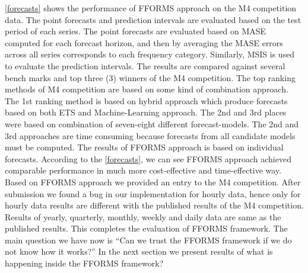 \documentclass[11pt,a4paper,]{article}
\begin{document}
\autoref{forecasts} shows the performance of FFORMS approach on the M4 competition data. The point forecasts and prediction intervals are evaluated based on the test period of each series. The point forecasts are evaluated based on MASE computed for each forecast horizon, and then by averaging the MASE errors across all series corresponds to each frequency category. Similarly, MSIS is used to evaluate the prediction intervals. The results are compared against several bench marks and top three (3) winners of the M4 competition. The top ranking methods of M4 competition are based on some kind of combination approach. The 1st ranking method is based on hybrid approach which produce forecasts based on both ETS and Machine-Learning approach. The 2nd and 3rd places were based on combination of seven-eight different forecast-models. The 2nd and 3rd approaches are time consuming because forecasts from all candidate models must be computed. The results of FFORMS approach is based on individual forecasts. According to the \autoref{forecasts}, we can see FFORMS approach achieved comparable performance in much more cost-effective and time-effective way. Based on FFORMS approach we provided an entry to the M4 competition. After submission we found a bug in our implementation for hourly data, hence only for hourly data results are different with the published results of the M4 competition. Results of yearly, quarterly, monthly, weekly and daily data are same as the published results. This completes the evaluation of FFORMS framework. The main question we have now is ``Can we trust the FFORMS framework if we do not know how it works?'' In the next section we present results of what is happening inside the FFORMS framework?
\end{document}
